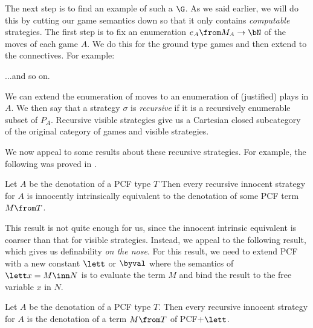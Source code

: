 The next step is to find an example of such a $\G$.
As we said earlier, we will do this by cutting our game semantics down so that it only contains \emph{computable} strategies.
The first step is to fix an enumeration $e_A\from M_A \to \bN$ of the moves of each game $A$.  
We do this for the ground type games and then extend to the connectives.  
For example:
...and so on.

We can extend the enumeration of moves to an enumeration of (justified) plays in $A$.  
We then say that a strategy $\sigma$ is \emph{recursive} if it is a recursively enumerable subset of $P_A$.
Recursive visible strategies give us a Cartesian closed subcategory of the original category of games and visible strategies.

We now appeal to some results about these recursive strategies.  
For example, the following was proved in \cite{hoPcf}.

\begin{theorem}
  Let $A$ be the denotation of a PCF type $T$
  Then every recursive innocent strategy for $A$ is innocently intrinsically equivalent to the denotation of some PCF term $M\from T$.
\end{theorem}

This result is not quite enough for us, since the innocent intrinsic equivalent is coarser than that for visible strategies.  
Instead, we appeal to the following result, which gives us definability \emph{on the nose}.  
For this result, we need to extend PCF with a new constant $\lett$ or $\byval$ where the semantics of $\lett x = M\inn N$ is to evaluate the term $M$ and bind the result to the free variable $x$ in $N$.

\begin{theorem}
  Let $A$ be the denotation of a PCF type $T$.
  Then every recursive innocent strategy for $A$ is the denotation of a term $M\from T$ of PCF+$\lett$.
\end{theorem}

